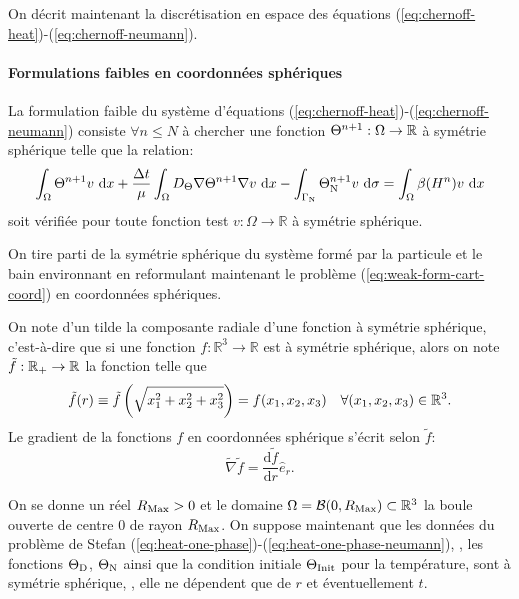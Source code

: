 On décrit maintenant la discrétisation en
espace des équations (\ref{eq:chernoff-heat})-(\ref{eq:chernoff-neumann}).

\paragraph{Formulations faibles en coordonnées sphériques}
La formulation faible du système d'équations
(\ref{eq:chernoff-heat})-(\ref{eq:chernoff-neumann}) consiste $\forall
n\leq N$ à chercher une fonction $\Theta^{n+1}:\Omega\to\mathbb R$
à symétrie sphérique telle que la relation:
\begin{equation}\label{eq:weak-form-cart-coord}
  \int_\Omega \temperature^{n+1} v\,\intd{x} + \frac{\timestep}{\mu} %
  \int_\Omega \electrolytetdiff\nabla \temperature^{n+1} \nabla v\,\intd{x} - %
  \int_{\Gamma_\mathrm{N}} \temperature^{n+1}_\mathrm{N} v\,\intd{\sigma} %
  = \int_\Omega \beta(\enthalpydensity^n)v\,\intd{x}
\end{equation}
soit vérifiée pour toute fonction test $v:\Omega\to\mathbb R$ à
symétrie sphérique.

On tire parti de la symétrie sphérique du système formé par la
particule et le bain environnant en reformulant maintenant le
problème (\ref{eq:weak-form-cart-coord}) en coordonnées sphériques.

On note d'un tilde la composante radiale d'une fonction à symétrie
sphérique, c'est-à-dire que si une fonction $f:\mathbb
R^3\to\mathbb R$ est à symétrie sphérique, alors on note $\tilde
f:\mathbb {\mathbb R_+}\to\mathbb R$ la fonction telle que
\begin{equation}\label{eq:spherical-symmetry}
  \tilde f(r) \equiv\tilde f\left( \sqrt{x_1^2 + x_2^2 + x_3^2} \right) = f(x_1, x_2,
  x_3)\quad \forall(x_1, x_2,x_3)\in\mathbb R^3.
\end{equation}
Le gradient de la fonctions $f$ en coordonnées sphérique s'écrit selon
$\tilde f$:
\begin{equation}\label{eq:spherical-gradient}
  \tilde\nabla\tilde f = \frac{\mathrm d\tilde f}{\mathrm dr}\hat e_r.
\end{equation}

On se donne un réel $R_\mathrm{Max} > 0$ et le domaine $\Omega = \mathcal B(0,
R_\mathrm{Max}) \subset \mathbb R^3$ la boule ouverte de centre $0$ de rayon
$R_\mathrm{Max}$. On suppose maintenant que les données du problème de Stefan
(\ref{eq:heat-one-phase})-(\ref{eq:heat-one-phase-neumann}), \ie, les
fonctions $\Theta_\mathrm{D}$, $\Theta_\mathrm{N}$ ainsi
que la condition initiale $\Theta_\text{Init}$ pour la température, sont à
symétrie sphérique, \ie, elle ne dépendent que de $r$ et
éventuellement $t$.

